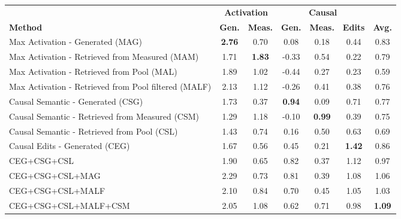 \documentclass{llmxive}
\begin{document}
\begin{table}[ht]
\centering
\setlength{\tabcolsep}{3.6pt}
\vspace{+0.12cm}
\begin{tabular}{@{}lcccccc@{}}
\toprule
& \multicolumn{2}{c}{\textbf{Activation}}
& \multicolumn{3}{c}{\textbf{Causal}}
&  \\
\cmidrule(lr){2-3}\cmidrule(lr){4-6}
\textbf{Method}
& \textbf{Gen.}
& \textbf{Meas.}
& \textbf{Gen.}
& \textbf{Meas.}
& \textbf{Edits}
& \textbf{Avg.} \\
\midrule

Max Activation - Generated (MAG)
& \textbf{2.76} & 0.70 & 0.08 & 0.18 & 0.44 & 0.83 \\

Max Activation - Retrieved from Measured (MAM)
& 1.71 & \textbf{1.83} & -0.33 & 0.54 & 0.22 & 0.79 \\

Max Activation - Retrieved from Pool (MAL)
& 1.89 & 1.02 & -0.44 & 0.27 & 0.23 & 0.59 \\

Max Activation - Retrieved from Pool filtered (MALF)
& 2.13 & 1.12 & -0.26 & 0.41 & 0.38 & 0.76 \\

Causal Semantic - Generated (CSG)
& 1.73 & 0.37 & \textbf{0.94} & 0.09 & 0.71 & 0.77 \\

Causal Semantic - Retrieved from Measured (CSM)
& 1.29 & 1.18 & -0.10 & \textbf{0.99} & 0.39 & 0.75 \\

Causal Semantic - Retrieved from Pool (CSL)
& 1.43 & 0.74 & 0.16 & 0.50 & 0.63 & 0.69 \\

Causal Edits - Generated (CEG)
& 1.67 & 0.56 & 0.45 & 0.21 & \textbf{1.42} & 0.86 \\

CEG+CSG+CSL
& 1.90 & 0.65 & 0.82 & 0.37 & 1.12 & 0.97 \\

CEG+CSG+CSL+MAG
& 2.29 & 0.73 & 0.81 & 0.39 & 1.08 & 1.06 \\

CEG+CSG+CSL+MALF
& 2.10 & 0.84 & 0.70 & 0.45 & 1.05 & 1.03 \\

CEG+CSG+CSL+MALF+CSM
& 2.05 & 1.08 & 0.62 & 0.71 & 0.98 & \textbf{1.09} \\


\end{tabular}
\end{table}
\end{document}
